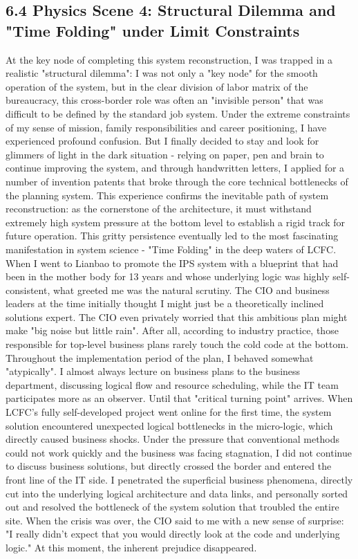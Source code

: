 \documentclass[11pt,a4paper]{article}
\begin{document}
\subsection*{6.4 Physics Scene 4: Structural Dilemma and "Time Folding" under Limit Constraints}


At the key node of completing this system reconstruction, I was trapped in a realistic "structural dilemma": I was not only a "key node" for the smooth operation of the system, but in the clear division of labor matrix of the bureaucracy, this cross-border role was often an "invisible person" that was difficult to be defined by the standard job system. Under the extreme constraints of my sense of mission, family responsibilities and career positioning, I have experienced profound confusion. But I finally decided to stay and look for glimmers of light in the dark situation - relying on paper, pen and brain to continue improving the system, and through handwritten letters, I applied for a number of invention patents that broke through the core technical bottlenecks of the planning system. This experience confirms the inevitable path of system reconstruction: as the cornerstone of the architecture, it must withstand extremely high system pressure at the bottom level to establish a rigid track for future operation. This gritty persistence eventually led to the most fascinating manifestation in system science - "Time Folding" in the deep waters of LCFC. When I went to Lianbao to promote the IPS system with a blueprint that had been in the mother body for 13 years and whose underlying logic was highly self-consistent, what greeted me was the natural scrutiny. The CIO and business leaders at the time initially thought I might just be a theoretically inclined solutions expert. The CIO even privately worried that this ambitious plan might make "big noise but little rain". After all, according to industry practice, those responsible for top-level business plans rarely touch the cold code at the bottom. Throughout the implementation period of the plan, I behaved somewhat "atypically". I almost always lecture on business plans to the business department, discussing logical flow and resource scheduling, while the IT team participates more as an observer. Until that "critical turning point" arrives. When LCFC's fully self-developed project went online for the first time, the system solution encountered unexpected logical bottlenecks in the micro-logic, which directly caused business shocks. Under the pressure that conventional methods could not work quickly and the business was facing stagnation, I did not continue to discuss business solutions, but directly crossed the border and entered the front line of the IT side. I penetrated the superficial business phenomena, directly cut into the underlying logical architecture and data links, and personally sorted out and resolved the bottleneck of the system solution that troubled the entire site. When the crisis was over, the CIO said to me with a new sense of surprise: "I really didn't expect that you would directly look at the code and underlying logic." At this moment, the inherent prejudice disappeared. 
\end{document}

